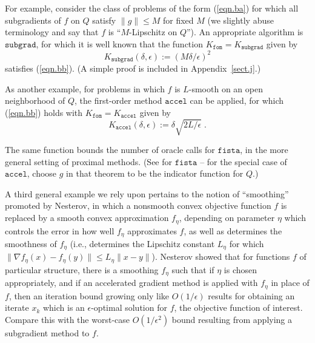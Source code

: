 \documentclass[reqno, 11pt]{amsart}
\numberwithin{equation}{section}
\newcommand{\fom}{\mathtt{fom}}
\newcommand{\subgrad}{\mathtt{subgrad}}
\newcommand{\accel}{\mathtt{accel}}
\newcommand{\fista}{\mathtt{fista}}
\begin{document}
For example, consider the class of problems of the form (\ref{eqn.ba})   for which all subgradients of $ f $ on $ Q $ satisfy $ \| g \| \leq M $ for fixed $ M $ (we slightly abuse terminology and say that $ f $ is ``$ M $-Lipschitz on $ Q $''). An appropriate algorithm is $ \subgrad $, for which it is well known that the function $ K_{\fom} = K_{\subgrad} $ given by 
\begin{equation}   \label{eqn.bd} 
K_{\mathtt{subgrad}}(\delta, \epsilon) :=  (M  \delta/\epsilon )^2  
\end{equation} 
satisfies (\ref{eqn.bb}). (A simple proof is included in Appendix~\ref{sect.j}.) 

As another example, for problems in which $ f $ is $ L $-smooth on an open neighborhood of $ Q $, the first-order method $ \accel $ can be applied, for which  (\ref{eqn.bb})   holds with $ K_{\fom} = K_{\mathtt{accel}} $ given by 
\begin{equation}  \label{eqn.be}  
  K_{\mathtt{accel}}(\delta,\epsilon ) :=   \delta \sqrt{2L/\epsilon}   \; . 
\end{equation}
  
The same function bounds the number of oracle calls for $ \fista $, in the more general setting of proximal methods. (See \cite[Thm 4.4]{beck2009fast} for $ \fista $ -- for the special case of $ \accel $, choose $ g $ in that theorem to be the indicator function for $ Q $.)

A third general example we rely upon pertains to the notion of ``smoothing'' promoted by Nesterov\cite{nesterov2005smooth}, in which a nonsmooth convex objective function $ f $ is replaced by a smooth convex approximation $ f_{\eta} $, depending on parameter $ \eta $ which controls the error in how well $ f_{\eta} $ approximates $ f $, as well as determines the smoothness of $ f_{\eta} $ (i.e., determines the Lipschitz constant $ L_{\eta} $ for which $ \| \nabla f_{\eta}(x) - f_{\eta}(y) \| \leq L_{\eta} \| x - y \| $).  Nesterov showed that for functions $ f $ of particular structure, there is a smoothing $ f_{\eta} $ such that if $ \eta $ is chosen appropriately, and if an accelerated gradient method is applied with $ f_{\eta} $ in place of $ f $, then an iteration bound growing only like $ O(1/\epsilon) $ results for obtaining an iterate $ x_k $ which is an $ \epsilon $-optimal solution for $ f $, the objective function of interest. Compare this with the worst-case $ O(1/ \epsilon^2) $ bound resulting from applying a subgradient method to $ f $.
\end{document}
